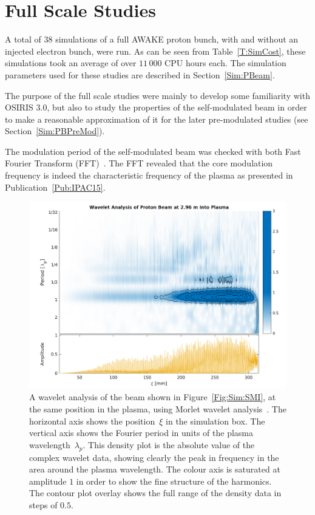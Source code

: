 \section{Full Scale Studies}
\label{SimA:FullScale}

A total of 38 simulations of a full AWAKE proton bunch, with and without an injected electron bunch, were run.
As can be seen from Table~\ref{T:SimCost}, these simulations took an average of over $11\,000$ CPU hours each.
The simulation parameters used for these studies are described in Section~\ref{Sim:PBeam}.

The purpose of the full scale studies were mainly to develop some familiarity with OSIRIS 3.0, but also to study the properties of the self-modulated beam in order to make a reasonable approximation of it for the later pre-modulated studies (see Section~\ref{Sim:PBPreMod}).

The modulation period of the self-modulated beam was checked with both Fast Fourier Transform (FFT)~\cite{van_loan:1992}.
The FFT revealed that the core modulation frequency is indeed the characteristic frequency of the plasma as presented in Publication~\ref{Pub:IPAC15}.

\begin{figure}[hbt]
    \centering
    \includegraphics[width=1.0\linewidth]{figures/PBSMIWavelet}
    \caption{\label{Fig:SimA:Wavelet}
        A wavelet analysis of the beam shown in Figure~\ref{Fig:Sim:SMI}, at the same position in the plasma, using Morlet wavelet analysis~\cite{torrence:1998}.
        The horizontal axis shows the position~$\xi$ in the simulation box.
        The vertical axis shows the Fourier period in units of the plasma wavelength~$\lambda_p$.
        This density plot is the absolute value of the complex wavelet data, showing clearly the peak in frequency in the area around the plasma wavelength.
        The colour axis is saturated at amplitude $1$ in order to show the fine structure of the harmonics.
        The contour plot overlay shows the full range of the density data in steps of $0.5$.
    }
\end{figure}

